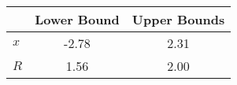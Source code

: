 \begin{tiny}\begin{tabular}{|l|c|c|}
\hline
&\textbf{Lower Bound}&\textbf{Upper Bounds}\\\hline
\textbf{$x$}&-2.78&2.31\\\hline
\textbf{$R$}&1.56&2.00\\\hline
\end{tabular}
\end{tiny}